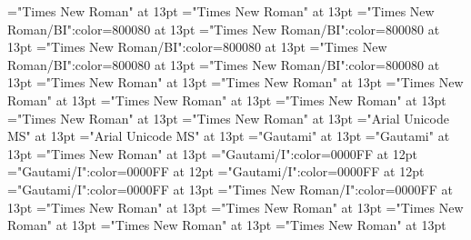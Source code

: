 \documentclass[a4paper]{article}
\begin{document}
\font\spanenspanentryletDatadicBody="Times New Roman" at 13pt
\font\sensespanentryletDatadicBody="Times New Roman" at 13pt
\font\grammaticalinfosensespanentryletDatadicBody="Times New Roman/BI":color=800080 at 13pt
\font\grammaticalinfoaftersensespanentryletDatadicBody="Times New Roman/BI":color=800080 at 13pt
\font\partofspeechengrammaticalinfosensespanentryletDatadicBody="Times New Roman/BI":color=800080 at 13pt
\font\spanenpartofspeechengrammaticalinfosensespanentryletDatadicBody="Times New Roman/BI":color=800080 at 13pt
\font\spanengrammaticalinfosensespanentryletDatadicBody="Times New Roman/BI":color=800080 at 13pt
\font{}="Times New Roman" at 13pt
\font\spanendefinitionensensespanentryletDatadicBody="Times New Roman" at 13pt
\font\LexSensepublishStemDefinitionPubensensespanentryletDatadicBody="Times New Roman" at 13pt
\font\spanenLexSensepublishStemDefinitionPubensensespanentryletDatadicBody="Times New Roman" at 13pt
\font\LexSensepublishStemGlossPubLcensensespanentryletDatadicBody="Times New Roman" at 13pt
\font\xitemenLexSensepublishStemGlossPubLcensensespanentryletDatadicBody="Times New Roman" at 13pt
\font\spanenxitemenLexSensepublishStemGlossPubLcensensespanentryletDatadicBody="Times New Roman" at 13pt
\font\xitemhiLexSensepublishStemGlossPubLcensensespanentryletDatadicBody="Arial Unicode MS" at 13pt
\font\spanhixitemhiLexSensepublishStemGlossPubLcensensespanentryletDatadicBody="Arial Unicode MS" at 13pt
\font\xitemteLexSensepublishStemGlossPubLcensensespanentryletDatadicBody="Gautami" at 13pt
\font\spantexitemteLexSensepublishStemGlossPubLcensensespanentryletDatadicBody="Gautami" at 13pt
\font\spansensespanentryletDatadicBody="Times New Roman" at 13pt
\font\exampleggoTeluINspansensespanentryletDatadicBody="Gautami/I":color=0000FF at 12pt
\font\examplebeforespansensespanentryletDatadicBody="Gautami/I":color=0000FF at 12pt
\font\exampleafterspansensespanentryletDatadicBody="Gautami/I":color=0000FF at 12pt
\font\spanggoTeluINexampleggoTeluINspansensespanentryletDatadicBody="Gautami/I":color=0000FF at 13pt
\font\spanenexampleggoTeluINspansensespanentryletDatadicBody="Times New Roman/I":color=0000FF at 13pt
\font\spanspansensespanentryletDatadicBody="Times New Roman" at 13pt
\font\spanspanspansensespanentryletDatadicBody="Times New Roman" at 13pt
\font\CmPossibilitypublishStemTransTypeAbbreviationPubenspanspanspansensespanentryletDatadicBody="Times New Roman" at 13pt
\font\spanenCmPossibilitypublishStemTransTypeAbbreviationPubenspanspanspansensespanentryletDatadicBody="Times New Roman" at 13pt
\font\CmPossibilitypublishStemTransTypeNamePubenspanspanspansensespanentryletDatadicBody="Times New Roman" at 13pt
\end{document}
